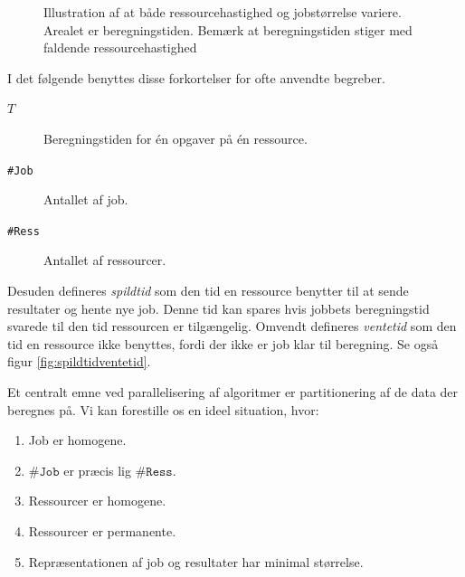 \documentclass[draft,a4paper,11pt]{article}
\begin{document}
\begin{figure}[!h]
\begin{center}

\caption{Illustration af at både ressourcehastighed og jobstørrelse variere. Arealet er beregningstiden. Bemærk at beregningstiden stiger med faldende ressourcehastighed}\label{fig:lillekassestorkasse} 
\end{center}
\end{figure}


I det følgende benyttes disse forkortelser for ofte anvendte begreber.
\begin{description}
	\item[$T$] Beregningstiden for én opgaver på én ressource.  
	\item[\texttt{\#Job}] Antallet af job.
	\item[\texttt{\#Ress}] Antallet af ressourcer.  
\end{description}

Desuden defineres \emph{spildtid} som den tid en ressource benytter til at sende resultater og hente nye job. Denne tid kan spares hvis jobbets beregningstid svarede til den tid ressourcen er tilgængelig. Omvendt defineres \emph{ventetid} som den tid en ressource ikke benyttes, fordi der ikke er job klar til beregning. Se også figur \ref{fig:spildtidventetid}.

Et centralt emne ved parallelisering af algoritmer er partitionering af de data der beregnes på. Vi kan forestille os en ideel situation, hvor:
\begin{enumerate}
	\item Job er homogene. \label{beregningstid}
	\item $\texttt{\#Job}$ er præcis lig $\texttt{\#Ress}$.\label{antal}
	\item Ressourcer er homogene. 
	\item Ressourcer er permanente.
	\item Repræsentationen af job og resultater har minimal størrelse.\label{jobbeskrivelse}
\end{enumerate}
\end{document}
